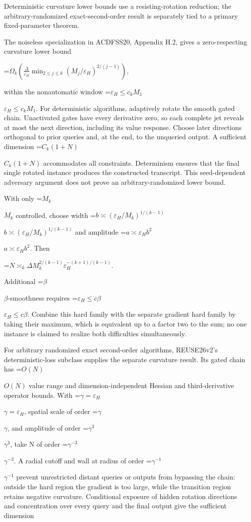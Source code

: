 \documentclass[10pt,a4paper]{article}
\newcommand{\AtlasMath}[1]{\par\begingroup\centering\setbox0=\hbox{$\displaystyle #1$}\ifdim\wd0>1.4\linewidth\typeout{ATLAS WIDE FORMULA: \the\wd0}\fi\ifdim\wd0>\linewidth\resizebox{\linewidth}{!}{\box0}\else\box0\fi\par\endgroup}
\newcommand{\AtlasInlineMath}[1]{\begingroup\setbox0=\hbox{$#1$}\ifdim\wd0>.4\linewidth\endgroup\AtlasMath{#1}\else\endgroup$#1$\fi}
\begin{document}
Deterministic curvature lower bounds use a resisting-rotation reduction; the arbitrary-randomized exact-second-order result is separately tied to a primary fixed-parameter theorem.

The noiseless specialization in ACDFSS20, Appendix H.2, gives a zero-respecting curvature lower bound

\AtlasMath{\Omega_k\left(\frac\Delta{\varepsilon_H}\min_{2\le j\le k}(M_j/\varepsilon_H)^{2/(j-1)}\right),}

within the nonautomatic window \AtlasInlineMath{\varepsilon_H\le c_kM_1}. For deterministic algorithms, adaptively rotate the smooth gated chain. Unactivated gates have every derivative zero, so each complete jet reveals at most the next direction, including its value response. Choose later directions orthogonal to prior queries and, at the end, to the unqueried output. A sufficient dimension \AtlasInlineMath{C_k(1+N)} accommodates all constraints. Determinism ensures that the final single rotated instance produces the constructed transcript. This seed-dependent adversary argument does not prove an arbitrary-randomized lower bound.

With only \AtlasInlineMath{M_k} controlled, choose width \AtlasInlineMath{b\asymp(\varepsilon_H/M_k)^{1/(k-1)}} and amplitude \AtlasInlineMath{a\asymp\varepsilon_Hb^2}. Then

\AtlasMath{N\asymp_k\Delta M_k^{2/(k-1)}\varepsilon_H^{-(k+1)/(k-1)}.}

Additional \AtlasInlineMath{\beta}-smoothness requires \AtlasInlineMath{\varepsilon_H\le c\beta}. Combine this hard family with the separate gradient hard family by taking their maximum, which is equivalent up to a factor two to the sum; no one instance is claimed to realize both difficulties simultaneously.

For arbitrary randomized exact second-order algorithms, REUSE26v2's deterministic-loss subclass supplies the separate curvature result. Its gated chain has \AtlasInlineMath{O(N)} value range and dimension-independent Hessian and third-derivative operator bounds. With \AtlasInlineMath{\gamma=\varepsilon_H}, spatial scale of order \AtlasInlineMath{\gamma}, and amplitude of order \AtlasInlineMath{\gamma^3}, take N of order \AtlasInlineMath{\gamma^{-3}}. A radial cutoff and wall at radius of order \AtlasInlineMath{\gamma^{-1}} prevent unrestricted distant queries or outputs from bypassing the chain: outside the hard region the gradient is too large, while the transition region retains negative curvature. Conditional exposure of hidden rotation directions and concentration over every query and the final output give the sufficient dimension
\end{document}
